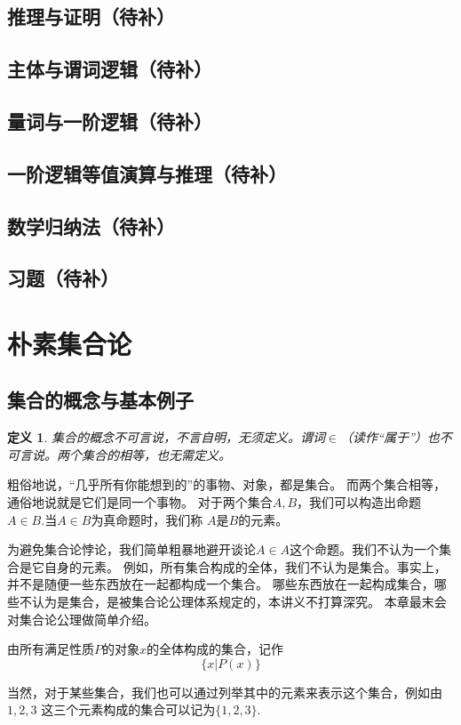 \documentclass[a4paper, 11pt]{article} %
\newcommand*{\vs}{\vspace{5pt}}
\newtheorem{definition}{定义}[subsection]
\begin{document}
\subsection{推理与证明（待补）}
\subsection{主体与谓词逻辑（待补）}
\subsection{量词与一阶逻辑（待补）}
\subsection{一阶逻辑等值演算与推理（待补）}
\subsection{数学归纳法（待补）}
\subsection{习题（待补）}

\section{朴素集合论}
\subsection{集合的概念与基本例子}
\begin{definition}
集合的概念不可言说，不言自明，无须定义。谓词$\in$（读作“属于”）也不可言说。两个集合的相等，也无需定义。
\end{definition}
粗俗地说，“几乎所有你能想到的”的事物、对象，都是集合。
而两个集合相等，通俗地说就是它们是同一个事物。
对于两个集合$A,B$，我们可以构造出命题$A\in B$.当$A\in B$为真命题时，我们称
$A$是$B$的元素。

为避免集合论悖论，我们简单粗暴地避开谈论$A\in A$这个命题。我们不认为一个集合是它自身的元素。
例如，所有集合构成的全体，我们不认为是集合。事实上，并不是随便一些东西放在一起都构成一个集合。
哪些东西放在一起构成集合，哪些不认为是集合，是被集合论公理体系规定的，本讲义不打算深究。
本章最末会对集合论公理做简单介绍。\vs

由所有满足性质$P$的对象$x$的全体构成的集合，记作
$$\{x|P(x)\}$$

当然，对于某些集合，我们也可以通过列举其中的元素来表示这个集合，例如由$1,2,3$
这三个元素构成的集合可以记为$\{1,2,3\}$.
\end{document}
